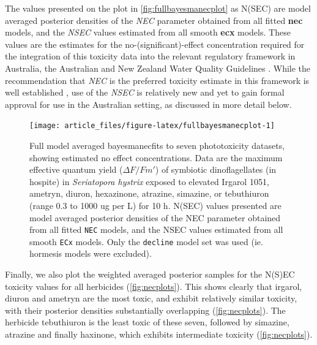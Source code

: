 \documentclass[
  shortnames]{jss}
\begin{document}
The values presented on the plot in \autoref{fig:fullbayesmanecplot} as N(SEC) are model averaged posterior densities of the \emph{NEC} parameter obtained from all fitted \textbf{nec} models, and the \emph{NSEC} values estimated from all smooth \textbf{ecx} models. These values are the  estimates for the no-(significant)-effect concentration required for the integration of this toxicity data into the relevant regulatory framework in Australia, the Australian and New Zealand Water Quality Guidelines \citep{anzg}. While the recommendation that \emph{NEC} is the preferred toxicity estimate in this framework is well established \citep[\citet{Warne2018c}]{Warne2015}, use of the \emph{NSEC} is relatively new \citep{Fisher2022} and yet to gain formal approval for use in the Australian setting, as discussed in more detail below.

\begin{CodeChunk}
\begin{figure}[!ht]

{\centering \texttt{[image: article\_files/figure-latex/fullbayesmanecplot-1]} 

}

\caption{Full model averaged bayesmanecfits to seven phototoxicity datasets, showing estimated no effect concentrations. Data are the maximum effective quantum yield ($\Delta F / Fm'$) of symbiotic dinoflagellates (in hospite) in \textit{Seriatopora hystrix} exposed to elevated Irgarol 1051, ametryn, diuron, hexazinone, atrazine, simazine, or tebuthiuron (range 0.3 to 1000 ug per L) for 10 h. N(SEC) values presented are model averaged posterior densities of the NEC parameter obtained from all fitted \texttt{NEC} models, and the NSEC values estimated from all smooth \texttt{ECx}  models. Only the \texttt{decline} model set was used (ie. hormesis models were excluded).}\label{fig:fullbayesmanecplot}
\end{figure}
\end{CodeChunk}

Finally, we also plot the weighted averaged posterior samples for the N(S)EC toxicity values for all herbicides (\autoref{fig:necplots}). This shows clearly that irgarol, diuron and ametryn are the most toxic, and exhibit relatively similar toxicity, with their posterior densities substantially overlapping (\autoref{fig:necplots}). The herbicide tebuthiuron is the least toxic of these seven, followed by simazine, atrazine and finally haxinone, which exhibits intermediate toxicity (\autoref{fig:necplots}).
\end{document}
